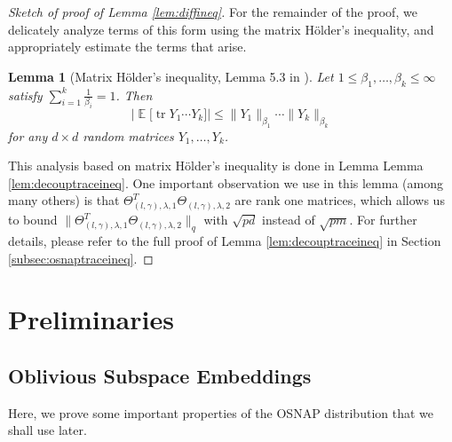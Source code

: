 \documentclass[11pt]{amsart}
\numberwithin{equation}{section}
\numberwithin{equation}{section}
\DeclareMathOperator{\E}{\mathbb{E}}
\DeclareMathOperator*{\tr}{tr}
\newtheorem*{lemmanon}{Lemma}
\theoremstyle{remark}
\theoremstyle{definition}
\begin{document}
\begin{proof}[Sketch of proof of Lemma \ref{lem:diffineq}]
   For the remainder of the proof, we delicately analyze terms of this form using the matrix H\"older's inequality, and appropriately estimate the terms that arise.
    \begin{lemmanon}[Matrix H\"older's inequality, Lemma 5.3 in \cite{brailovskaya2022universality}]
Let $1\le 
\beta_1,\ldots,\beta_k\le\infty$ satisfy $\sum_{i=1}^k\frac{1}{\beta_i}=1$. Then
$$
	\Big|\E\!\big[\tr Y_1\cdots Y_k\big]\Big| \le
	\|Y_1\|_{\beta_1}\cdots \|Y_k\|_{\beta_k}
$$
for any $d\times d$ random matrices $Y_1,\ldots,Y_k$.
\end{lemmanon}
 This analysis based on matrix H\"older's inequality is done in Lemma Lemma \ref{lem:decouptraceineq}.  One important observation we use in this lemma (among many others) is that $\Theta_{(l, \gamma), \lambda,1}^T\Theta_{(l, \gamma), \lambda,2}$ are rank one matrices, which allows us to bound $\| \Theta_{(l, \gamma), \lambda,1}^T\Theta_{(l, \gamma), \lambda,2} \|_q$ with $\sqrt{pd}$ instead of $\sqrt{pm}$. For further details, please refer to the full proof of  Lemma \ref{lem:decouptraceineq} in Section \ref{subsec:osnaptraceineq}.
\end{proof}

 
\section{Preliminaries} \label{sec:prelim}

\subsection{Oblivious Subspace Embeddings}

Here, we prove some important properties of the OSNAP distribution that we shall use later.
\end{document}
